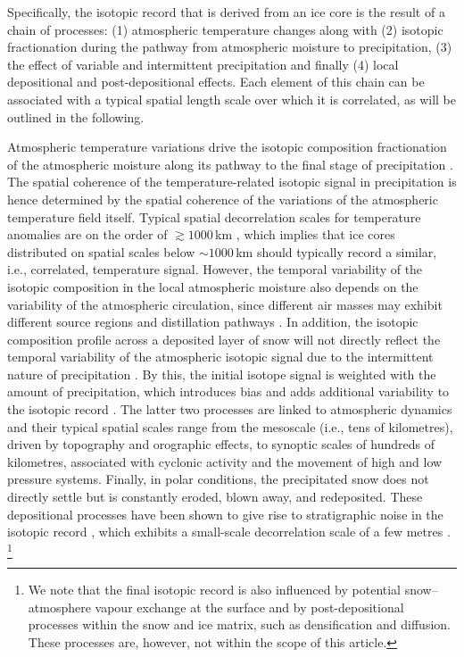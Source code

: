 \documentclass[draft]{agujournal2019}
\begin{document}
Specifically, the isotopic record that is derived from an ice core is the result
of a chain of processes: (1) atmospheric temperature changes along with (2) isotopic
fractionation during the pathway from atmospheric moisture to precipitation, (3)
the effect of variable and intermittent precipitation and finally (4) local
depositional and post-depositional effects. Each element of this chain can be
associated with a typical spatial length scale over which it is correlated, as
will be outlined in the following.

Atmospheric temperature variations drive the isotopic composition fractionation
of the atmospheric moisture along its pathway to the final stage of
precipitation \cite{Dansgaard1964,Jouzel1984}. The spatial coherence of the
temperature-related isotopic signal in precipitation is hence determined by the
spatial coherence of the variations of the atmospheric temperature field
itself. Typical spatial decorrelation scales for temperature anomalies are on
the order of $\gtrsim1000$\,km \cite{Jones1997}, which implies that ice cores
distributed on spatial scales below $\sim 1000$\,km should typically record a
similar, i.e., correlated, temperature signal. However, the temporal variability
of the isotopic composition in the local atmospheric moisture also depends on
the variability of the atmospheric circulation, since different air masses may
exhibit different source regions and distillation pathways \cite{Schlosser2004,
Sodemann2008a,Birks2009,Kuttel2012}. In addition, the isotopic composition
profile across a deposited layer of snow will not directly reflect the temporal
variability of the atmospheric isotopic signal due to the intermittent nature of
precipitation \cite{Schleiss2015}. By this, the initial isotope signal is
weighted with the amount of precipitation, which introduces bias
\cite{Steig1994,Laepple2011a} and adds additional variability to the isotopic
record \cite{Persson2011,Casado2020}. The latter two processes are linked to
atmospheric dynamics and their typical spatial scales range from the mesoscale
(i.e., tens of kilometres), driven by topography and orographic effects, to
synoptic scales of hundreds of kilometres, associated with cyclonic activity and
the movement of high and low pressure systems. Finally, in polar conditions, the
precipitated snow does not directly settle but is constantly eroded, blown away,
and redeposited. These depositional processes have been shown to give rise to
stratigraphic noise in the isotopic record
\cite{Fisher1985,Munch2016,Laepple2016}, which exhibits a small-scale
decorrelation scale of a few metres \cite{Munch2016}.%
\footnote{We note that the final isotopic record is also influenced by
  potential snow--atmosphere vapour exchange at the surface and by
  post-depositional processes within the snow and ice matrix, such as
  densification and diffusion. These processes are, however, not within the
  scope of this article.}
\end{document}
